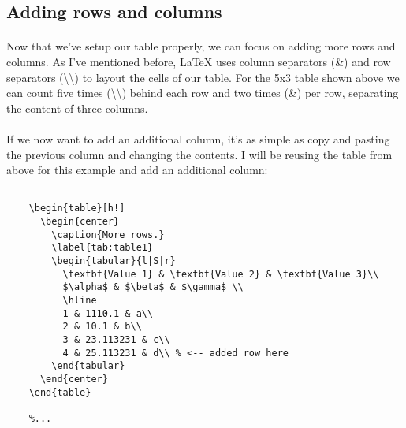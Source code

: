   \subsection{Adding rows and columns}
  \paragraph{}
    Now that we've setup our table properly, we can focus 
    on adding more rows and columns. As I've mentioned before,
    LaTeX uses column separators (\&) and row separators 
    (\textbackslash \textbackslash ) to layout the cells 
    of our table. For the 5x3 table shown above we can 
    count five times (\textbackslash \textbackslash ) 
    behind each row and two times (\&) per row, 
    separating the content of three columns.
  \paragraph{}
  If we now want to add an additional column, it's as simple as copy and pasting the previous column and changing the contents. I will be reusing the table from above for this example and add an additional column:
  
  
   
  \begin{lstlisting}[language={[LaTeX]TeX},breaklines=true,frame=single]
    %...

    \begin{table}[h!]
      \begin{center}
        \caption{More rows.}
        \label{tab:table1}
        \begin{tabular}{l|S|r}
          \textbf{Value 1} & \textbf{Value 2} & \textbf{Value 3}\\
          $\alpha$ & $\beta$ & $\gamma$ \\
          \hline
          1 & 1110.1 & a\\
          2 & 10.1 & b\\
          3 & 23.113231 & c\\
          4 & 25.113231 & d\\ % <-- added row here
        \end{tabular}
      \end{center}
    \end{table}
    
    %...
  \end{lstlisting}
